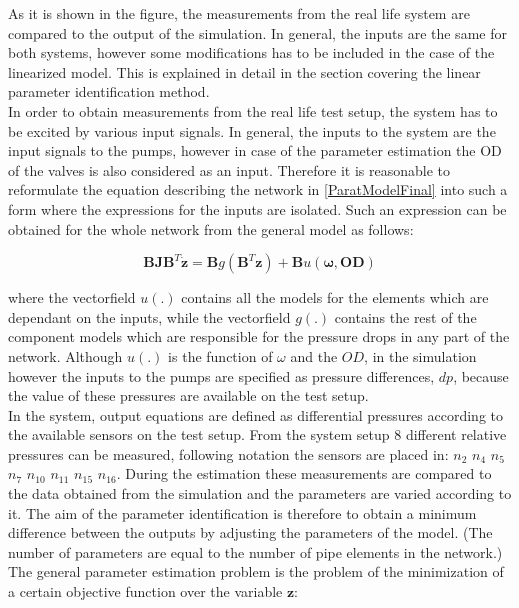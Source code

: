 As it is shown in the figure, the measurements from the real life system are compared to the output of the simulation. In general, the inputs are the same for both systems, however some modifications has to be included in the case of the linearized model. This is explained in detail in the section covering the linear parameter identification method.
\\
In order to obtain measurements from the real life test setup, the system has to be excited by various input signals. In general, the inputs to the system are the input signals to the pumps, however in case of the parameter estimation the OD of the valves is also considered as an input. Therefore it is reasonable to reformulate the equation describing the network in \eqref{ParatModelFinal} into such a form where the expressions for the inputs are isolated. Such an expression can be obtained for the whole network from the general model as follows: 

\begin{equation}
 \pmb{B}\pmb{J {B}}^T \pmb{\dot{z}} = \pmb{B} g(\pmb{B}^T \pmb{z})+ \pmb{B} u(\pmb{\omega},\pmb{OD})
 \label{InputOutputmodel}
\end{equation}

where the vectorfield $u(.)$ contains all the models for the elements which are dependant on the inputs, while the vectorfield $g(.)$ contains the rest of the component models which are responsible for the pressure drops in any part of the network. Although $u(.)$ is the function of $\omega$ and the $OD$, in the simulation however the inputs to the pumps are specified as pressure differences, $dp$, because the value of these pressures are available on the test setup. 
\\
In the system, output equations are defined as differential pressures according to the available sensors on the test setup. From the system setup $8$ different relative pressures can be measured, following  notation the sensors are placed in: 
$n_2$ $n_4$ $n_5$ $n_7$ $n_{10}$ $n_{11}$ $n_{15}$ $n_{16}$. During the estimation these measurements are compared to the data obtained from the simulation and the parameters are varied according to it. The aim of the parameter identification is therefore to obtain a minimum difference between the outputs by adjusting the parameters of the model. (The number of parameters are equal to the number of pipe elements in the network.) The general parameter estimation problem is the problem of the minimization of a certain objective function over the variable $\pmb{z}$: 

